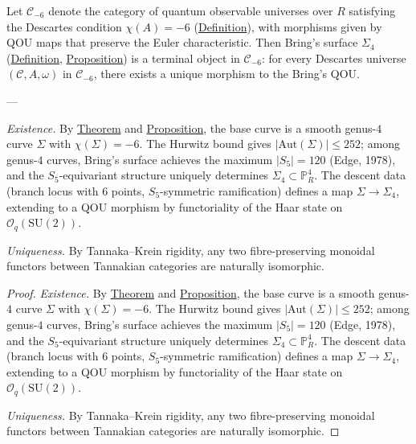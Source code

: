 \begin{theorem}
  \label{thm:descartes}
Let $\mathcal{C}_{-6}$ denote the category of quantum observable universes
over $R$ satisfying the Descartes condition $\chi(A) = -6$
(\hyperref[def:descartes-condition]{Definition}), with morphisms given by QOU maps
that preserve the Euler characteristic.  Then Bring's surface $\Sigma_4$
(\hyperref[def:brings-surface]{Definition},
\hyperref[prop:brings-is-qou]{Proposition}) is a terminal object in
$\mathcal{C}_{-6}$: for every Descartes universe
$(\mathcal{C}, A, \omega)$ in $\mathcal{C}_{-6}$, there exists a unique
morphism to the Bring's QOU.

---

\emph{Existence.}
By \hyperref[thm:qu-to-qou]{Theorem} and
\hyperref[prop:genus-maximal-descent]{Proposition}, the base curve is a smooth
genus-$4$ curve $\Sigma$ with $\chi(\Sigma) = -6$.
The Hurwitz bound gives $\lvert\mathrm{Aut}(\Sigma)\rvert \leq 252$;
among genus-$4$ curves, Bring's surface achieves the maximum
$\lvert S_5\rvert = 120$ (Edge, 1978), and the $S_5$-equivariant structure
uniquely determines $\Sigma_4 \subset \mathbb{P}^4_R$.
The descent data (branch locus with $6$ points, $S_5$-symmetric
ramification) defines a map $\Sigma \to \Sigma_4$, extending to a QOU
morphism by functoriality of the Haar state on
$\mathcal{O}_q(\mathrm{SU}(2))$.

\emph{Uniqueness.}
By Tannaka--Krein rigidity, any two fibre-preserving monoidal functors
between Tannakian categories are naturally isomorphic.
\end{theorem}
\begin{proof}
\emph{Existence.}
By \hyperref[thm:qu-to-qou]{Theorem} and
\hyperref[prop:genus-maximal-descent]{Proposition}, the base curve is a smooth
genus-$4$ curve $\Sigma$ with $\chi(\Sigma) = -6$.
The Hurwitz bound gives $\lvert\mathrm{Aut}(\Sigma)\rvert \leq 252$;
among genus-$4$ curves, Bring's surface achieves the maximum
$\lvert S_5\rvert = 120$ (Edge, 1978), and the $S_5$-equivariant structure
uniquely determines $\Sigma_4 \subset \mathbb{P}^4_R$.
The descent data (branch locus with $6$ points, $S_5$-symmetric
ramification) defines a map $\Sigma \to \Sigma_4$, extending to a QOU
morphism by functoriality of the Haar state on
$\mathcal{O}_q(\mathrm{SU}(2))$.

\emph{Uniqueness.}
By Tannaka--Krein rigidity, any two fibre-preserving monoidal functors
between Tannakian categories are naturally isomorphic.
\end{proof}

